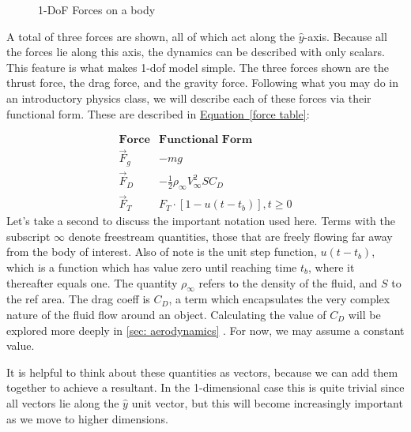 \documentclass[10pt, openany, titlepage]{book}
\theoremstyle{definition}
\newcommand{\eqautoref}[1]{\hyperref[#1]{Equation~\eqref{#1}}}
\let\oldautoref\autoref
\renewcommand{\autoref}[1]{%
  \begingroup
  \hypersetup{linkcolor=black}%
  \oldautoref{#1}%
  \endgroup
}
\begin{document}
\begin{figure}[ht]
    \caption{1-DoF Forces on a body}
    \label{fig: 1DoF forces}
\end{figure}

A total of three forces are shown, all of which act along the $\hat{y}$-axis. Because all the forces lie along this axis, the dynamics can be described with only scalars. This feature is what makes 1-\gls{dof} model simple. The three forces shown are the thrust force, the drag force, and the gravity force. Following what you may do in an introductory physics class, we will describe each of these forces via their functional form. These are described in \eqautoref{force table}:

\begin{equation}\label{force table}
    \begin{array}{cc}
    \mathrm{\textbf{Force}}&\mathrm{\textbf{Functional Form}}\\
    \vec{F}_g &  -mg\\
     \vec{F}_D& -\frac{1}{2} \rho_{\infty} V^2_{\infty}SC_D\\
     \vec{F}_T & F_T\cdot[1-u(t-t_b)], t\ge0
\end{array}
\end{equation}
Let's take a second to discuss the important notation used here. Terms with the subscript $\infty$ denote \gls{freestream} quantities, those that are freely flowing far away from the body of interest. Also of note is the unit step function, $u(t-t_b)$, which is a function which has value zero until reaching time $t_b$, where it thereafter equals one. The quantity $\rho_\infty$ refers to the density of the fluid, and $S$ to the \gls{ref area}. The \gls{drag coeff} is $C_D$, a term which encapsulates the very complex nature of the fluid flow around an object. Calculating the value of $C_D$ will be explored more deeply in \autoref{sec: aerodynamics}. For now, we may assume a constant value.

It is helpful to think about these quantities as vectors, because we can add them together to achieve a resultant. In the 1-dimensional case this is quite trivial since all vectors lie along the $\hat{y}$ unit vector, but this will become increasingly important as we move to higher dimensions.
\end{document}
